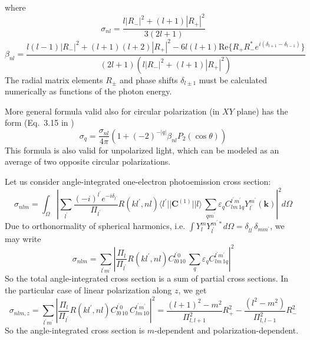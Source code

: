 \documentclass[a4paper,oneside,12pt]{extarticle}
\begin{document}
%
where
\begin{equation}
\sigma_{nl} = \frac{l|R_-|^2  + (l+1)|R_+|^2}{3(2l+1)}
\label{eq:sigma_nl}
\end{equation}
$$
\beta_{nl} = \frac{ l(l-1)|R_-|^2 + (l+1)(l+2)|R_+|^2 - 6l(l+1) \mathrm{Re}\{R_+R_-^* e^{i(\delta_{l+1}-\delta_{l-1})} \}}{(2l+1)(l|R_-|^2  + (l+1)|R_+|^2)}
$$
The radial matrix elements $R_{\pm}$ and phase shifts $\delta_{l\pm 1}$ must be calculated numerically as functions of the photon energy.

More general formula valid also for circular polarization (in $XY$ plane) has the form (Eq.~3.15 in \cite{Amusia})
$$
\sigma_q = \frac{\sigma_{nl}}{4\pi}(1+(-2)^{-|q|}\beta_{nl} P_2(\cos\theta))
$$
%
This formula is also valid for unpolarized light, which can be modeled as an average of two opposite circular polarizations.

Let us consider angle-integrated one-electron photoemission cross section:
\begin{equation}
\sigma_{nlm} = \int_{\Omega} \left| \sum_{l^{\prime}} \frac{(-i)^{l^{\prime}}e^{-i\delta_{l^{\prime}}}}{\Pi_{l^{\prime}}} R(kl^{\prime},nl) 
\langle l^{\prime} || \mathbf{C}^{(1)} || l \rangle  \,
\sum_{q m^{\prime}}  \varepsilon_q C_{l m \, 1 q}^{l^{\prime} m^{\prime}} Y_{l^{\prime}}^{m^{\prime}}(\mathbf{k}) \right|^2 d\Omega
\end{equation}
%
Due to orthonormality of spherical harmonics, i.e. $\int Y_l^m Y_{l^\prime}^{m^\prime *} d\Omega = \delta_{l l^\prime}\delta_{m m^\prime}$, we may write
%
\begin{equation}
\sigma_{nlm} = \sum_{l^{\prime} m^{\prime}} \left| \frac{\Pi_l}{\Pi_{l^{\prime}}} R(kl^{\prime},nl) 
C_{l 0 \, 1 0}^{l^{\prime} 0}  \,
\sum_{q }  \varepsilon_q C_{l m \, 1 q}^{l^{\prime} m^{\prime}} \right|^2 
\end{equation}
%
So the total angle-integrated cross section is a sum of partial cross sections.
In the particular case of linear polarization along $z$, we get
\begin{equation}
\sigma_{nlm,z} = \sum_{l^{\prime} m^{\prime}} \left| \frac{\Pi_l}{\Pi_{l^{\prime}}} R(kl^{\prime},nl) 
C_{l 0 \, 1 0}^{l^{\prime} 0}  \,
C_{l m \, 1 0}^{l^{\prime} m^{\prime}} \right|^2 = 
\frac{(l+1)^2-m^2}{\Pi^2_{l,l+1}} R^2_+ 
-\frac{(l^2-m^2)}{\Pi^2_{l,l-1}} R^2_-
\end{equation}
%
So the angle-integrated cross section is $m$-dependent and polarization-dependent.
\end{document}
